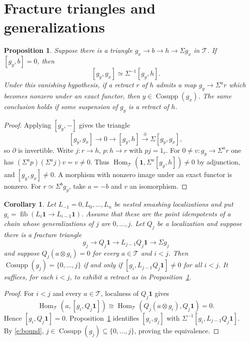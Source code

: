 \documentclass[11pt,reqno]{amsart}
\newtheorem{proposition}[theorem]{Proposition}
\newtheorem{corollary}[theorem]{Corollary}
\theoremstyle{definition}
\DeclareMathOperator{\Cosupp}{Cosupp}
\DeclareMathOperator{\Hom}{Hom}
\DeclareMathOperator{\fib}{fib}
\newcommand{\T}{\mathcal T}
\newcommand{\one}{\mathbf 1}
\numberwithin{equation}{section}
\begin{document}
\section{Fracture triangles and generalizations}



\begin{proposition}\label{p:fract}
Suppose there is a triangle $g_x\to b\to h\to\Sigma g_x$ in $\T$. If $[g_y,b]=0$, then
\[
 [g_y,g_x]\simeq\Sigma^{-1}[g_y,h].
\]
Under this vanishing hypothesis, if a retract $r$ of $h$ admits a map $g_y\to\Sigma^a r$ which becomes nonzero under an exact functor, then $y\in\Cosupp(g_x)$. The same conclusion holds if some suspension of $g_y$ is a retract of $h$.
\end{proposition}
\begin{proof}
Applying $[g_y,-]$ gives the triangle
\[
 [g_y,g_x]\longrightarrow0\longrightarrow[g_y,h]
 \xrightarrow{\partial}\Sigma[g_y,g_x],
\]
so $\partial$ is invertible. Write $j:r\to h$, $p:h\to r$ with $pj=1_r$. For $0\ne v:g_y\to\Sigma^a r$ one has $(\Sigma^ap)(\Sigma^aj)v=v\ne0$. Thus $\Hom_{\T}(\one,\Sigma^a[g_y,h])\ne0$ by adjunction, and $[g_y,g_x]\ne0$. A morphism with nonzero image under an exact functor is nonzero. For $r\simeq\Sigma^b g_y$, take $a=-b$ and $v$ an isomorphism.
\end{proof}

\begin{corollary}\label{c:layer}
Let $L_{-1}=0,L_0,\ldots,L_n$ be nested smashing localizations and put $g_i=\fib(L_i\one\to L_{i-1}\one)$. Assume that these are the point idempotents of a chain whose generalizations of $j$ are $0,\ldots,j$. Let $Q_j$ be a localization and suppose there is a fracture triangle
\[
 g_j\longrightarrow Q_j\one\longrightarrow L_{j-1}Q_j\one\longrightarrow\Sigma g_j
\]
and suppose $Q_j(a\otimes g_i)=0$ for every $a\in\T$ and $i<j$. Then $\Cosupp(g_j)=\{0,\ldots,j\}$ if and only if $[g_i,L_{j-1}Q_j\one]\ne0$ for all $i<j$. It suffices, for each $i<j$, to exhibit a retract as in Proposition~\ref{p:fract}.
\end{corollary}
\begin{proof}
For $i<j$ and every $a\in\T$, localness of $Q_j\one$ gives
\[
 \Hom_{\T}(a,[g_i,Q_j\one])
 \cong\Hom_{\T}(Q_j(a\otimes g_i),Q_j\one)=0.
\]
Hence $[g_i,Q_j\one]=0$. Proposition~\ref{p:fract} identifies $[g_i,g_j]$ with $\Sigma^{-1}[g_i,L_{j-1}Q_j\one]$. By \eqref{e:bound}, $j\in\Cosupp(g_j)\subseteq\{0,\ldots,j\}$, proving the equivalence.
\end{proof}
\end{document}
